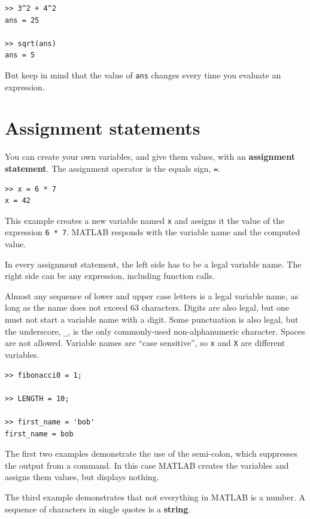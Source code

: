 \documentclass[
]{book}
\begin{document}
\begin{verbatim}
>> 3^2 + 4^2
ans = 25

>> sqrt(ans)
ans = 5
\end{verbatim}

But keep in mind that the value of {\tt ans} changes every time
you evaluate an expression.


\section{Assignment statements}

You can create your own variables, and give them values, with
an {\bf assignment statement}.  The assignment operator is the
equals sign, {\tt =}.

\begin{verbatim}
>> x = 6 * 7
x = 42
\end{verbatim}

This example creates a new variable named {\tt x} and assigns it the
value of the expression {\tt 6 * 7}.  MATLAB responds with the
variable name and the computed value.

In every assignment statement, the left side has to be a
legal variable name.  The right side can be any expression,
including function calls.

Almost any sequence of lower and upper case letters is a legal
variable name, as long as the name does not exceed 63 characters.  
Digits are also legal, but one must not start a variable name with a digit.
Some punctuation is also legal, but the underscore,
{\tt \_}, is the only commonly-used non-alphanumeric character.  
Spaces are not allowed.  Variable names are
``case sensitive'', so {\tt x} and {\tt X} are different variables.

\begin{verbatim}
>> fibonacci0 = 1;

>> LENGTH = 10;

>> first_name = 'bob'
first_name = bob
\end{verbatim}

The first two examples demonstrate the use of the semi-colon, which
suppresses the output from a command.  In this case MATLAB creates the
variables and assigns them values, but displays nothing.

The third example demonstrates that not everything
in MATLAB is a number.  A sequence of characters in single quotes is
a {\bf string}.
\end{document}
